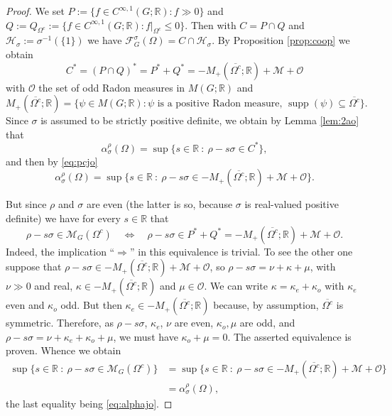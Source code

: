 \documentclass[[a4paper,english,12pt]{amsart}
\theoremstyle{plain}
\theoremstyle{remark}
\newcommand\supp{\operatorname{supp}}
\newcommand{\FF}{\mathcal{F}}
\newcommand{\MM}{\mathcal{M}}
\newcommand{\OO}{\mathcal{O}}
\newcommand{\RR}{\mathbb R}
\newcommand{\si}{\sigma}
\newcommand{\rh}{\rho}
\begin{document}
\begin{proof}
We set $P:=\{f\in C^{\infty,1}(G;\RR):f\gg 0\}$ and $Q:=Q_{\Omega^c}:=\{f\in C^{\infty,1}(G;\RR): f|_{\Omega^c}\leq 0\}$. Then with $C=P\cap Q$ and $\mathcal{H}_\si:=\si^{-1}(\{1\})$ we have  $\FF_G^\si(\Omega)=C\cap \mathcal{H}_\si$.
By Proposition \ref{prop:coop} we obtain
\begin{equation}\label{eq:pcjo}
C^*=(P\cap Q)^*=P^*+Q^*=- M_{+}(\overline{\Omega^c};\RR) + \MM +\OO
\end{equation}
with $\OO$ the set of odd Radon measures in $M(G;\RR)$ and
	\[
	M_{+}(\overline{\Omega^c};\RR)=\{\psi\in M(G;\RR):\psi \text{ is a positive Radon measure, $\supp(\psi)\subseteq \overline{\Omega^c}$}\}.
	\]
Since $\si$ is assumed to be strictly positive definite, we obtain by Lemma \ref{lem:2ao} that
\[
\alpha_\si^\rh (\Omega)= \sup \{ s \in \RR ~:~\rh- s \si  \in C^* \},
\]
and then by \eqref{eq:pcjo}
\begin{equation}\label{eq:alphajo}
\alpha_\si^\rh (\Omega)=\sup \{ s \in \RR ~:~\rh- s\si \in - M_{+}(\overline{\Omega^c};\RR) + \MM +\OO\}.
\end{equation}

But since $\rh$ and $\si$ are even (the latter is so, because $\si$ is real-valued positive definite) we have for every $s\in \RR$ that 
\[
\rh- s \si  \in \MM_G(\Omega^c) \quad\Longleftrightarrow\quad \rh- s \si \in P^*+Q^*=- M_{+}(\overline{\Omega^c};\RR) + \MM +\OO.
\]
Indeed, the implication ``$\Rightarrow$'' in this equivalence is trivial. To see the other one suppose that $\rh- s \si \in- M_{+}(\overline{\Omega^c};\RR) + \MM+\OO$, so $\rh- s \si=\nu+\kappa+\mu$, with $\nu\gg 0$ and real, $\kappa\in -M_+(\overline{\Omega^c};\RR)$ and $\mu\in \OO$. We can write $\kappa=\kappa_e+\kappa_o$ with $\kappa_e$ even and $\kappa_o$ odd. But then $\kappa_e\in-M_+(\overline{\Omega^c};\RR)$ because, by assumption, $\overline{\Omega^c}$ is symmetric. Therefore, as $\rh- s \si $, $\kappa_e$, $\nu$ are even, $\kappa_o, \mu$ are odd, and $\rh- s \si=\nu+\kappa_e+\kappa_o+\mu$, we must have $\kappa_o+\mu=0$. The asserted equivalence is proven. Whence we obtain
\begin{align*}
\sup \{ s \in \RR ~:~\rh- s\si \in \MM_G(\Omega^c) \}&
=\sup \{ s \in \RR ~:~\rh- s\si \in - M_{+}(\overline{\Omega^c};\RR) + \MM +\OO\}\\
&=\alpha_\si^\rh (\Omega),
\end{align*}
the last equality being \eqref{eq:alphajo}.
\end{proof}
\end{document}
